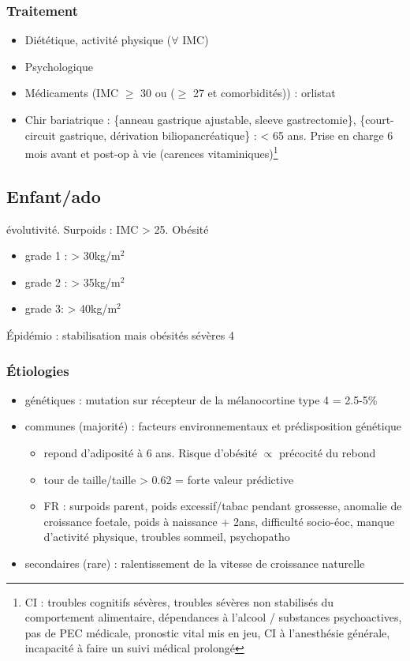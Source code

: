\documentclass[11pt]{article}
\begin{document}
\subsubsection{Traitement}
\label{sec:org00d57b2}
\begin{itemize}
\item Diététique, activité physique (\(\forall\) IMC)
\item Psychologique
\item Médicaments (IMC \(\ge\) 30 ou (\(\ge\) 27 et comorbidités)) : orlistat
\item Chir bariatrique :  \{anneau gastrique ajustable, sleeve gastrectomie\},
\{court-circuit gastrique, dérivation biliopancréatique\} : < 65 ans. Prise en
charge 6 mois avant et post-op à vie (carences vitaminiques)\footnote{CI : troubles cognitifs sévères, troubles sévères non stabilisés du
comportement alimentaire, dépendances à l'alcool / substances psychoactives, pas
de PEC médicale, pronostic vital mis en jeu, CI à l'anesthésie générale,
incapacité à faire un suivi médical prolongé}
\end{itemize}
\subsection{Enfant/ado}
\label{sec:org159ad19}
\danger{} évolutivité. Surpoids : IMC > 25. Obésité 
\begin{itemize}
\item grade 1 : > 30kg/m\(^{\text{2}}\)
\item grade 2 : > 35kg/m\(^{\text{2}}\)
\item grade 3: > 40kg/m\(^{\text{2}}\)
\end{itemize}

Épidémio : stabilisation mais obésités sévères \texttimes{}4

\subsubsection{Étiologies}
\label{sec:org9393cb4}
\begin{itemize}
\item génétiques : mutation sur récepteur de la mélanocortine type 4 = 2.5-5\%
\item communes (majorité) : facteurs environnementaux et prédisposition génétique
\begin{itemize}
\item repond d'adiposité à 6 ans. Risque d'obésité \(\propto\) précocité du rebond
\item tour de taille/taille > 0.62 = forte valeur prédictive
\item FR : surpoids parent, poids excessif/tabac pendant grossesse, anomalie de
croissance foetale, \inc\inc poids à naissance + 2ans, difficulté
socio-éoc, manque d'activité physique, troubles sommeil, psychopatho
\end{itemize}
\item secondaires (rare) : ralentissement de la vitesse de croissance naturelle
\end{itemize}
\end{document}
